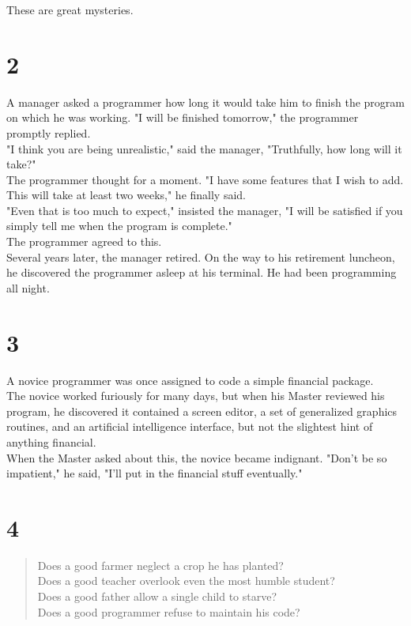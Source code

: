 \documentclass[14pt, letterpaper]{book}
\begin{document}
These are great mysteries.    

\section*{2}
A manager asked a programmer how long it would take him to finish the program on which he was working. "I will be finished tomorrow," the programmer promptly replied.\\

"I think you are being unrealistic," said the manager, "Truthfully, how long will it take?"\\

The programmer thought for a moment. "I have some features that I wish to add. This will take at least two weeks," he finally said.\\

"Even that is too much to expect," insisted the manager, "I will be satisfied if you simply tell me when the program is complete."\\

The programmer agreed to this.\\

Several years later, the manager retired. On the way to his retirement luncheon, he discovered the programmer asleep at his terminal. He had been programming all night.\\

\section*{3}
A novice programmer was once assigned to code a simple financial package.\\

The novice worked furiously for many days, but when his Master reviewed his program, he discovered it contained a screen editor, a set of generalized graphics routines, and an artificial intelligence interface, but not the slightest hint of anything financial.\\

When the Master asked about this, the novice became indignant. "Don't be so impatient," he said, "I'll put in the financial stuff eventually."\\

\section*{4}
\begin{verse}
    Does a good farmer neglect a crop he has planted? \\
    Does a good teacher overlook even the most humble student? \\
    Does a good father allow a single child to starve? \\
    Does a good programmer refuse to maintain his code?\\
\end{verse}
\end{document}

